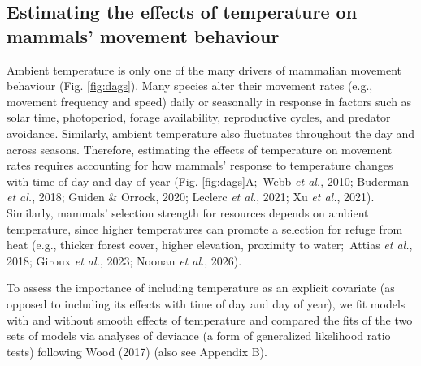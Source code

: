 \documentclass[
  12pt,
]{article}
\begin{document}
\subsection{Estimating the effects of temperature on mammals' movement behaviour}\label{estimating-the-effects-of-temperature-on-mammals-movement-behaviour}

\noindent Ambient temperature is only one of the many drivers of mammalian movement behaviour (Fig. \ref{fig:dags}). Many species alter their movement rates (e.g., movement frequency and speed) daily or seasonally in response in factors such as solar time, photoperiod, forage availability, reproductive cycles, and predator avoidance. Similarly, ambient temperature also fluctuates throughout the day and across seasons. Therefore, estimating the effects of temperature on movement rates requires accounting for how mammals' response to temperature changes with time of day and day of year (Fig. \ref{fig:dags}A\(;\) Webb \emph{et al.}, 2010; Buderman \emph{et al.}, 2018; Guiden \& Orrock, 2020; Leclerc \emph{et al.}, 2021; Xu \emph{et al.}, 2021). Similarly, mammals' selection strength for resources depends on ambient temperature, since higher temperatures can promote a selection for refuge from heat (e.g., thicker forest cover, higher elevation, proximity to water\(;\) Attias \emph{et al.}, 2018; Giroux \emph{et al.}, 2023; Noonan \emph{et al.}, 2026).

To assess the importance of including temperature as an explicit covariate (as opposed to including its effects with time of day and day of year), we fit models with and without smooth effects of temperature and compared the fits of the two sets of models via analyses of deviance (a form of generalized likelihood ratio tests) following Wood (2017) (also see Appendix B).
\end{document}
